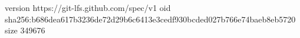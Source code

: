 version https://git-lfs.github.com/spec/v1
oid sha256:b686dea617b3236de72d29b6c6413e3cedf930bcded027b766e74baeb8eb5720
size 349676
